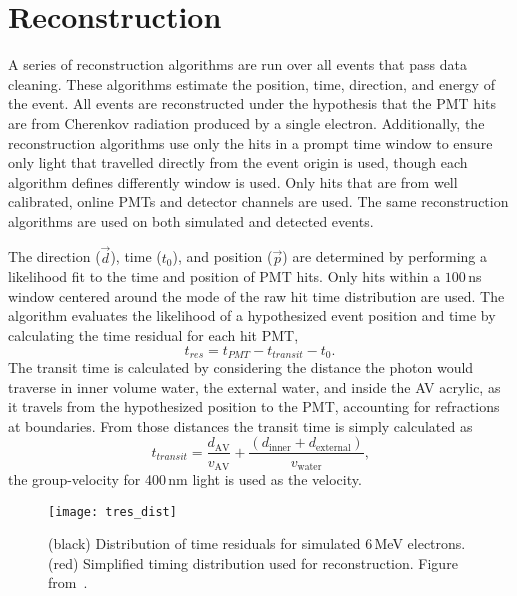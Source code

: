 \chapter{Reconstruction}
\label{sec:reconstruction}
A series of reconstruction algorithms are run over all events that pass data cleaning.
These algorithms estimate the position, time, direction, and energy of the event.
All events are reconstructed under the hypothesis that the PMT hits are from Cherenkov radiation
produced by a single electron.
Additionally, the reconstruction algorithms use only the hits in a prompt time window to ensure only light
that travelled directly from the event origin is used,
though each algorithm defines differently window is used.
Only hits that are from well calibrated, online PMTs and detector channels are used.
The same reconstruction algorithms are used on both simulated and detected events.

The direction ($\vec{d}$), time ($t_{0}$), and position ($\vec{p}$) are determined by performing a likelihood
fit to the time and position of PMT hits.
Only hits within a $100$\,ns window centered around the mode of the raw hit time
distribution are used.
The algorithm evaluates the likelihood of a hypothesized event position and time by
calculating the time residual for each hit PMT,
\begin{equation}
\label{eqn:tres}
t_{res} = t_{PMT} - t_{transit} - t_{0}\text{.}
\end{equation}
The transit time is calculated by considering the distance the photon would
traverse in inner volume water, the external water, and inside the AV acrylic, as
it travels from the hypothesized position to the PMT, accounting for refractions
at boundaries.
From those distances the transit time is simply calculated as
\begin{equation}
t_{transit} = \frac{d_{\mathrm{AV}}}{v_{\mathrm{AV}}} + \frac{(d_{\mathrm{inner}} + d_{\mathrm{external}})}{v_{\mathrm{water}}}\text{,}
\end{equation}
the group-velocity for 400\,nm light is used as the velocity.

\begin{figure}[htbp]
\centering
\texttt{[image: tres\_dist]}
\caption[Simulated Distribution of $t_{\mathrm{res}}$]{
(black) Distribution of time residuals for simulated 6\,MeV electrons. (red) Simplified
timing distribution used for reconstruction. Figure from~\citep{richie_thesis}.}
\label{fig:tres_dist}
\end{figure}

